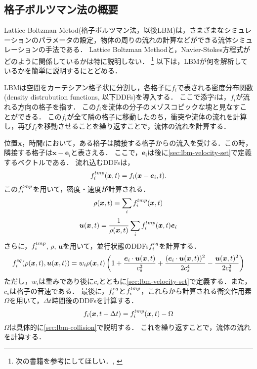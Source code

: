 \subsection{格子ボルツマン法の概要}
Lattice Boltzman Metod(格子ボルツマン法，以後LBM)は，さまざまなシミュレーションのパラメータの設定，物体の周りの流れの計算などができる流体シミュレーションの手法である．
Lattice Boltzman Methodと，Navier-Stokes方程式がどのように関係しているかは特に説明しない．
\footnote{
    次の書籍を参考にしてほしい．\cite{ref:kruger2017lattice}, \cite{ref:chapman1990mathematical}
}
以下は，LBMが何を解析しているかを簡単に説明するにとどめる\cite{ref:lbm}．

LBMは空間をカーテシアン格子状に分割し，各格子に$f_i$で表される密度分布関数(density distrubution functions, 以下DDFs)を導入する．
ここで添字$i$は，$f_i$が流れる方向の格子を指す．
この$f_i$を流体の分子のメゾスコピックな塊と見なすことができる．
この$f_i$が全て隣の格子に移動したのち，衝突や流体の流れを計算し，再び$f_i$を移動させることを繰り返すことで，流体の流れを計算する．

位置$\bm{x}$，時間$t$において，ある格子は隣接する格子からの流入を受ける．この時，隣接する格子は$\bm{x}-\bm{e}_i$と表さえる．
ここで，$\bm{e}_i$は後に\ref{sec:lbm-velocity-set}で定義するベクトルである．
流れ込むDDFsは，
\begin{equation}\label{eq:streaming}
    f^{tmp}_{i}(\bm{x}, t)=f_{i}(\bm{x}-\bm{e}_i, t).
\end{equation}
この$f^{tmp}_{i}$を用いて，密度・速度が計算される．
\begin{equation}\label{eq:rho}
    \rho(\bm{x}, t)=\sum_{i} f^{tmp}_{i}(\bm{x}, t)
\end{equation}
\begin{equation}\label{eq:velocity}
    \bm{u}(\bm{x}, t)=\frac{1}{\rho(\bm{x}, t)} \sum_{i} f^{tmp}_{i}(\bm{x}, t) \bm{e}_{i}
\end{equation}
さらに，$f^{tmp}_{i}$, $\rho$, $\bm{u}$を用いて，並行状態のDDFs$f^{eq}_{i}$を計算する．
\begin{equation}\label{eq:equil-ddf}
    f^{eq}_{i}(\rho(\bm{x}, t), \bm{u}(\bm{x}, t)) = w_i \rho(\bm{x}, t) \left(1 + \frac{\bm{e}_i \cdot \bm{u}(\bm{x}, t)}{c_s^2} + \frac{(\bm{e}_i \cdot \bm{u}(\bm{x}, t))^2}{2c_s^4} - \frac{\bm{u}(\bm{x}, t)^2}{2c_s^2} \right)
\end{equation}
ただし，$w_i$は重みであり後に$c_i$とともに\ref{sec:lbm-velocity-set}で定義する．また，$c_s$は格子の音速である．
最後に，$f^{eq}_{i}$と$f^{tmp}_{i}$，これらから計算される衝突作用素$\Omega$を用いて，$\Delta t$時間後のDDFsを計算する．
\begin{equation}\label{eq:next-ddf}
    f_i(\bm{x}, t+\Delta t) = f^{tmp}_{i}(\bm{x}, t) - \Omega
\end{equation}
$\Omega$は具体的に\ref{sec:lbm-collision}で説明する．
これを繰り返すことで，流体の流れを計算する．

